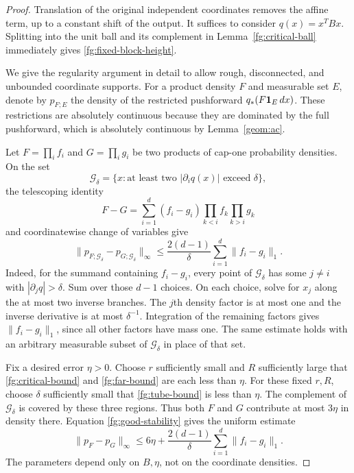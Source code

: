 \begin{proof}
Translation of the original independent coordinates removes
the affine term, up to a constant shift of the output.
It suffices to consider $q(x)=x^TBx$.
Splitting into the unit ball and its complement in
Lemma~\ref{fg:critical-ball} immediately gives
\eqref{fg:fixed-block-height}.

We give the regularity argument in detail to allow rough,
disconnected, and unbounded coordinate supports.
For a product density $F$ and measurable set $E$, denote by
$p_{F;E}$ the density of the restricted pushforward
$q_*(F{\bf1}_E\,dx)$.
These restrictions are absolutely continuous because they
are dominated by the full pushforward, which is absolutely
continuous by Lemma~\ref{geom:ac}.

Let $F=\prod_i f_i$ and $G=\prod_i g_i$ be two products of
cap-one probability densities.  On the set
\[
 \mathcal G_\delta
 =\{x:\text{at least two }|\partial_iq(x)|\text{ exceed }\delta\},
\]
the telescoping identity
\[
 F-G=\sum_{i=1}^d(f_i-g_i)
              \prod_{k<i}f_k\prod_{k>i}g_k
\]
and coordinatewise change of variables give
\begin{equation}\label{fg:good-stability}
 \|p_{F;\mathcal G_\delta}-p_{G;\mathcal G_\delta}\|_\infty
 \leq\frac{2(d-1)}{\delta}
             \sum_{i=1}^d\|f_i-g_i\|_1 .
\end{equation}
Indeed, for the summand containing $f_i-g_i$, every point
of $\mathcal G_\delta$ has some $j\ne i$ with
$|\partial_jq|>\delta$.
Sum over those $d-1$ choices.  On each choice, solve for
$x_j$ along the at most two inverse branches.
The $j$th density factor is at most one and the inverse
derivative is at most $\delta^{-1}$.
Integration of the remaining factors gives
$\|f_i-g_i\|_1$, since all other factors have mass one.
The same estimate holds with an arbitrary measurable subset
of $\mathcal G_\delta$ in place of that set.

Fix a desired error $\eta>0$.
Choose $r$ sufficiently small and $R$ sufficiently large
that \eqref{fg:critical-bound} and \eqref{fg:far-bound} are
each less than $\eta$.
For these fixed $r,R$, choose $\delta$ sufficiently small
that \eqref{fg:tube-bound} is less than $\eta$.
The complement of $\mathcal G_\delta$ is covered by these
three regions.  Thus both $F$ and $G$ contribute at most
$3\eta$ in density there.  Equation
\eqref{fg:good-stability} gives the uniform estimate
\begin{equation}\label{fg:rough-stability}
 \|p_F-p_G\|_\infty
 \leq6\eta+\frac{2(d-1)}{\delta}
                    \sum_{i=1}^d\|f_i-g_i\|_1.
\end{equation}
The parameters depend only on $B,\eta$, not on the
coordinate densities.


\end{proof}
